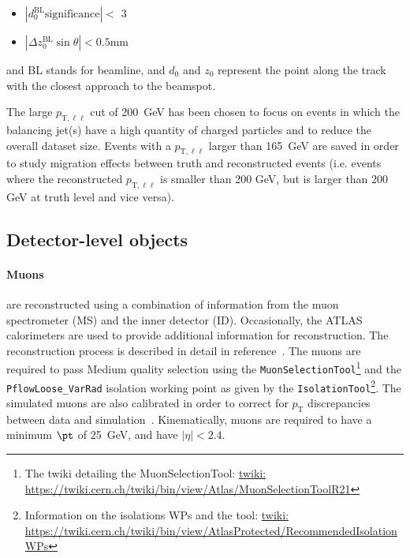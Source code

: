 \begin{itemize}
    \item $|d_0^{\text{BL}}\text{significance}| < $ 3
    \item $|\Delta z_0^{\text{BL}}\sin\theta| < 0.5 $mm
\end{itemize}

and BL stands for beamline, and $d_0$ and $z_0$ represent the point along the track with the closest approach to the beamspot.

The large $p_{\text{T},\ell\ell}$ cut of 200~GeV has been chosen to focus on events in which the balancing jet(s) have a high quantity of charged particles and to reduce the overall dataset size. Events with a $p_{\text{T},\ell\ell}$ larger than 165~GeV are saved in order to study migration effects between truth and reconstructed events (i.e. events where the reconstructed $p_{\text{T},\ell\ell}$
is smaller than 200 GeV, but is larger than 200 GeV at truth level and vice versa).

\subsection{Detector-level objects}

\paragraph{Muons} are reconstructed using a combination of information from the muon spectrometer (MS) and the inner detector (ID). Occasionally, the ATLAS calorimeters are used to provide additional information for reconstruction. The reconstruction process is described in detail in reference~\cite{Aad:2016jkr}.
The muons are required to pass Medium quality selection using the \texttt{MuonSelectionTool}\footnote{The twiki detailing the MuonSelectionTool: \url{twiki: https://twiki.cern.ch/twiki/bin/view/Atlas/MuonSelectionToolR21}} and the \texttt{PflowLoose\_VarRad} isolation working point as given by
the \texttt{IsolationTool}\footnote{Information on the isolations WPs and the tool: \url{twiki: https://twiki.cern.ch/twiki/bin/view/AtlasProtected/RecommendedIsolationWPs}}. The simulated muons are also calibrated in order to correct for $p_\text{T}$ discrepancies between data and simulation~\cite{Aad:2016jkr}.
Kinematically, muons are required to have a minimum $\pt$ of 25~GeV, and have $|\eta|<2.4$.

